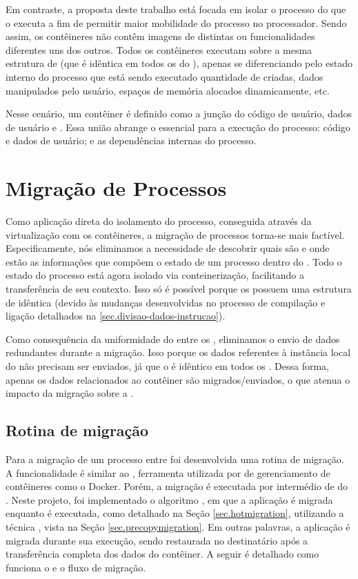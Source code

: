 Em contraste, a proposta deste trabalho está focada em isolar o processo do \cluster que o executa a fim de permitir maior mobilidade do processo no processador. Sendo assim, os contêineres não contêm imagens de \so distintas ou funcionalidades diferentes uns dos outros. Todos os contêineres executam sobre a mesma estrutura de  (que é idêntica em todos os \clusters do \lw), apenas se diferenciando pelo estado interno do processo que está sendo executado \eg quantidade de \threads criadas, dados manipulados pelo usuário, espaços de memória alocados dinamicamente, etc.

Nesse cenário, um contêiner é definido como a junção do código de usuário, dados de usuário e \uarea. Essa união abrange o essencial para a execução do processo: código e dados de usuário; e as dependências internas do processo.

\section{Migração de Processos}
\label{sec.migracao}

Como aplicação direta do isolamento do processo, conseguida através da virtualização com os contêineres, a migração de processos torna-se mais factível. Especificamente, nós eliminamos a necessidade de descobrir quais são e onde estão as informações que compõem o estado de um processo dentro do \nanvix. Todo o estado do processo está agora isolado via conteinerização, facilitando a transferência de seu contexto. Isso só é possível porque os \clusters possuem uma estrutura de  idêntica (devido às mudanças desenvolvidas no processo de compilação e ligação detalhados na \autoref{sec.divisao-dados-instrucao}). 

Como consequência da uniformidade do  entre os \clusters, eliminamos o envio de dados redundantes durante a migração. Isso porque os dados referentes à instância local do \os não precisam ser enviados, já que o  é idêntico em todos os \clusters. Dessa forma, apenas os dados relacionados ao contêiner são migrados/enviados, o que atenua o impacto da migração sobre a \noc.

\subsection{Rotina de migração}
\label{sec.rotina-migracao}

Para a migração de um processo entre \clusters foi desenvolvida uma rotina de migração. A funcionalidade é similar ao \criu, ferramenta utilizada por \softwares de gerenciamento de contêineres como o Docker. Porém, a migração é executada por intermédio de \daemons do \os. Neste projeto, foi implementado o algoritmo \hotmigration, em que a aplicação é migrada enquanto é executada, como detalhado na Seção \ref{sec.hotmigration}, utilizando a técnica \precopy, vista na Seção \ref{sec.precopymigration}. Em outras palavras, a aplicação é migrada durante sua execução, sendo restaurada no \cluster destinatário após a transferência completa dos dados do contêiner. A seguir é detalhado como funciona o \daemon e o fluxo de migração.

